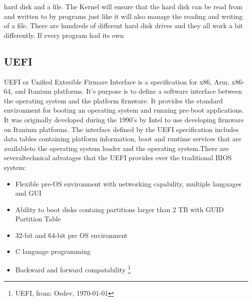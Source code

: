 hard disk and a
file. The Kernel will ensure that the hard disk can be read from and written
to by programs just like it will also manage the reading and writing of a
file. There are hundreds of different hard disk drives and they all work a
bit differently. If every program had its own 

\subsection{UEFI}

UEFI or Unified Extesible Firmare Interface is a specification for x86, Arm, x86-64, and Itanium platforms. It's purpose is to define a
software interface between the operating system and the platform firmware. It provides the standard environment for booting an 
operating system and running pre-boot applications. It was originally developed during the 1990's by Intel to use developing firmware
on Itanium platforms. The interface defined by the UEFI specification includes data tables containing platform information, boot and runtime services that are availableto the operating system loader and the operating system.There are  severaltechnical advatages that
the UEFI provides over the traditional BIOS system: 

\begin{itemize}

\item Flexible pre-OS environment with networking capability, multiple languages and GUI
\item Ability to boot disks containg partitions larger than 2 TB with GUID Partition Table
\item 32-bit and 64-bit pre OS environment
\item C language programming
\item Backward and forward compatability \footnote{UEFI, from: Osdev, \today}

\end{itemize}

